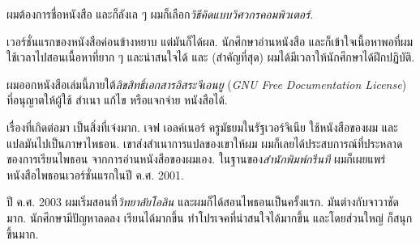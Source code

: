 
ผมต้องการชื่อหนังสือ และก็ลังเล ๆ ผมก็เลือก\textit{วิธีคิดแบบวิศวกรคอมพิวเตอร์}.


เวอร์ชั่นแรกของหนังสือค่อนข้างหยาบ แต่มันก็ได้ผล.
นักศึกษาอ่านหนังสือ 
และก็เข้าใจเนื้อหาพอที่ผมใช้เวลาไปสอนเนื้อหาที่ยาก ๆ และน่าสนใจได้ 
และ (สำคัญที่สุด) ผมได้มีเวลาให้นักศึกษาได้ฝึกปฏิบัติ.


ผมออกหนังสือเล่มนี้ภายใต้\textit{ลิขสิทธิ์เอกสารอิสระจีเอนยู} (\textit{GNU Free Documentation License})
ที่อนุญาตให้ผู้ใช้ สำเนา แก้ไข หรือแจกจ่าย หนังสือได้.


เรื่องที่เกิดต่อมา เป็นสิ่งที่เจ๋งมาก.
เจฟ เอลค์เนอร์ ครูมัธยมในรัฐเวอร์จิเนีย ใช้หนังสือของผม
และแปลมันไปเป็นภาษาไพธอน.
เขาส่งสำเนาการแปลของเขาให้ผม
ผมก็เลยได้ประสบการณ์ที่ประหลาดของการเรียนไพธอน
จากการอ่านหนังสือของผมเอง.
ในฐานของ\textit{สำนักพิมพ์กรีนที} ผมก็เผยแพร่หนังสือไพธอนเวอร์ชั่นแรกในปี ค.ศ. 2001.


ปี ค.ศ. 2003 ผมเริ่มสอนที่\textit{วิทยาลัยโอลิน}
และผมก็ได้สอนไพธอนเป็นครั้งแรก.
มันต่างกับจาวาชัดมาก.
นักศึกษามีปัญหาลดลง เรียนได้มากขึ้น ทำโปรเจคที่น่าสนใจได้มากขึ้น
และโดยส่วนใหญ่ ก็สนุกขึ้นมาก.

